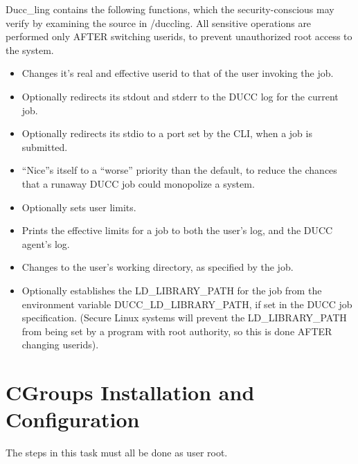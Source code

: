        Ducc\_ling contains the following functions, which the security-conscious may verify by examining
       the source in \duccruntime/duccling.  All sensitive operations are performed only AFTER switching
       userids, to prevent unauthorized root access to the system.
       \begin{itemize}
         \item Changes it's real and effective userid to that of the user invoking the job.
         \item Optionally redirects its stdout and stderr to the DUCC log for the current job.
         \item Optionally redirects its stdio to a port set by the CLI, when a job is submitted.
         \item ``Nice''s itself to a ``worse'' priority than the default, to reduce the chances
           that a runaway DUCC job could monopolize a system.
         \item Optionally sets user limits.
         \item Prints the effective limits for a job to both the user's log, and the DUCC agent's log.
         \item Changes to the user's working directory, as specified by the job.
         \item Optionally establishes the LD\_LIBRARY\_PATH for the job from the environment variable
           DUCC\_LD\_LIBRARY\_PATH, if set in the DUCC job specification. (Secure Linux systems will
           prevent the LD\_LIBRARY\_PATH from being set by a program with root authority, so this is
           done AFTER changing userids).
       \end{itemize}

\section{CGroups Installation and Configuration}
    The steps in this task must all be done as user root.

